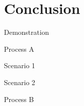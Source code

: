 \section{Conclusion}


			
\begin{frame}{Demonstration}
	\begin{block}{Process A}
	\end{block}
	\begin{block}{Scenario 1}
	\end{block}
	\begin{alertblock}{Scenario 2}
	\end{alertblock}
	\begin{block}{Process B}
	\end{block}
	\note{}
\end{frame}
